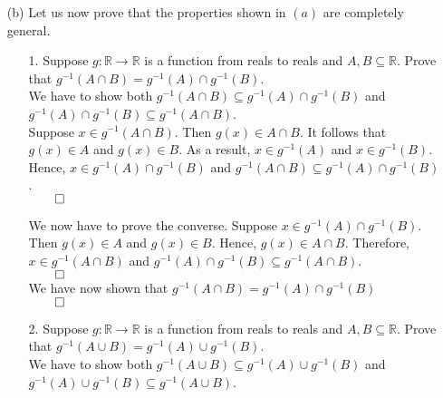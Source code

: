 \documentclass[11pt]{article}
\newcommand{\reals}{\mathbb{R}}
\begin{document}
\begin{itemize}
\begin{itemize}
            \item[(b)]
                Let us now prove that the properties shown in $(a)$ are
                completely general.

                \begin{itemize}
                    \item[1.]
                    Suppose $g : \reals \to \reals$ is a function from
                    reals to reals and $A, B \subseteq \reals$. Prove that
                    $g^{-1}(A \cap B) = g^{-1}(A) \cap g^{-1}(B)$.\\

                    We have to show both $g^{-1}(A \cap B) \subseteq g^{-1}(A)
                    \cap g^{-1}(B)$ and $g^{-1}(A) \cap g^{-1}(B) \subseteq
                    g^{-1}(A \cap B)$.\\

                    Suppose $x \in g^{-1}(A \cap B)$. Then $g(x) \in A \cap B$.
                    It follows that $g(x) \in A$ and $g(x) \in B$. As a result,
                    $x \in g^{-1}(A)$ and $x \in g^{-1}(B)$. Hence, $x \in
                    g^{-1}(A) \cap g^{-1}(B)$ and $g^{-1}(A \cap B) \subseteq
                    g^{-1}(A) \cap g^{-1}(B)$.\\
                    $\qed$

                    We now have to prove the converse. Suppose $x \in g^{-1}(A)
                    \cap g^{-1}(B)$. Then $g(x) \in A$ and $g(x) \in B$. Hence,
                    $g(x) \in A \cap B$. Therefore, $x \in g^{-1}(A \cap B)$
                    and $g^{-1}(A) \cap g^{-1}(B) \subseteq g^{-1}(A \cap B)$.
                    \\
                    $\qed$\\

                    We have now shown that $g^{-1}(A \cap B) = g^{-1}(A) \cap
                    g^{-1}(B)$\\
                    $\qed$

                    \item[2.]
                    Suppose $g : \reals \to \reals$ is a function from
                    reals to reals and $A, B \subseteq \reals$. Prove that
                    $g^{-1}(A \cup B) = g^{-1}(A) \cup g^{-1}(B)$.\\

                    We have to show both $g^{-1}(A \cup B) \subseteq g^{-1}(A)
                    \cup g^{-1}(B)$ and $ g^{-1}(A) \cup g^{-1}(B) \subseteq
                    g^{-1}(A \cup B)$.\\


\end{itemize}
\end{itemize}
\end{itemize}
\end{document}
